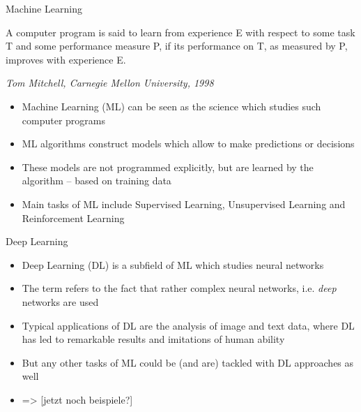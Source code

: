 \documentclass[11pt,compress,t,notes=noshow, xcolor=table]{beamer}
\begin{document}

\begin{frame}{Machine Learning}

  A computer program is said to learn from experience E with respect to
  some task T and some performance measure P, if its performance on T, as 
  measured by P, improves with experience E. \\
      
  \begin{footnotesize}
  \emph{Tom Mitchell, Carnegie Mellon University, 1998}
  \end{footnotesize}
  
\begin{itemize}
	\item Machine Learning (ML) can be seen as the science which studies such computer programs
	\item ML algorithms construct models which allow to make predictions or decisions
	\item These models are not programmed explicitly, but are learned by the algorithm -- based on training data
	\item Main tasks of ML include Supervised Learning, Unsupervised Learning and Reinforcement Learning
\end{itemize}
  
\end{frame}


\begin{frame}{Deep Learning}

\begin{itemize}
	\item Deep Learning (DL) is a subfield of ML which studies neural networks
	\item The term refers to the fact that rather complex neural networks, i.e. \emph{deep} networks are used
	\item Typical applications of DL are the analysis of image and text data, where DL has led to remarkable results and imitations of human ability
	\item But any other tasks of ML could be (and are) tackled with DL approaches as well
	\item => [jetzt noch beispiele?]
\end{itemize}
  
\end{frame}
\end{document}

